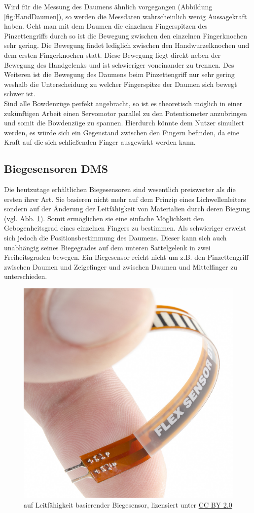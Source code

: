 \documentclass[a4paper,12pt,final]{article} %
\numberwithin{equation}{section} %
\numberwithin{figure}{section} %
\numberwithin{table}{section} %
\begin{document}
Wird für die Messung des Daumens ähnlich vorgegangen (Abbildung \ref{fig:HandDaumen}), so werden die Messdaten wahrscheinlich wenig Aussagekraft haben.
Geht man mit dem Daumen die einzelnen Fingerspitzen des Pinzettengriffs durch so ist die Bewegung zwischen den einzelnen Fingerknochen sehr gering. Die Bewegung findet lediglich zwischen den Hand\-wur\-zel\-knoch\-en und dem ersten Fingerknochen statt.
Diese Bewegung liegt direkt neben der Bewegung des Handgelenks und ist schwieriger voneinander zu trennen. Des Weiteren ist die Bewegung des Daumens beim Pinzettengriff nur sehr gering weshalb  die Unterscheidung zu welcher Fingerspitze der Daumen sich bewegt schwer ist.\\
Sind alle Bowdenzüge perfekt angebracht, so ist es theoretisch möglich in einer zukünftigen Arbeit einen Servomotor parallel zu den Potentiometer anzubringen und somit die Bowdenzüge zu spannen.
Hierdurch könnte dem Nutzer simuliert werden, es würde sich ein Gegenstand zwischen den Fingern befinden, da eine Kraft auf die sich schließenden Finger ausgewirkt werden kann.  
\subsection{Biegesensoren DMS}
Die heutzutage erhältlichen Biegesensoren sind wesentlich preiswerter als die ersten ihrer Art. Sie basieren nicht mehr auf dem Prinzip eines Lichwellenleiters sondern auf der Änderung der Leitfähigkeit von Materialien durch deren Biegung (vgl. Abb. \ref{fig:FlexSensor}). Somit ermöglichen sie eine einfache Möglichkeit den Gebogenheitsgrad eines einzelnen Fingers zu bestimmen. Als schwieriger erweist sich jedoch die Positionsbestimmung des Daumens. Dieser kann sich auch unabhängig seines Biegegrades auf dem unteren Sattelgelenk in zwei Freiheitsgraden bewegen. Ein Biegesensor reicht nicht um z.B. den Pinzettengriff zwischen Daumen und Zeigefinger und zwischen Daumen und Mittelfinger zu unterschieden.


\begin{figure}[ht]
	\begin{center}
		\includegraphics[width=0.5\linewidth]{Bilder/Flex_sensor.jpg}
		\caption{auf Leitfähigkeit basierender Biegesensor, lizensiert unter \href{https://creativecommons.org/licenses/by/2.0/}{CC BY 2.0}}
		\label{fig:FlexSensor}
	\end{center}
\end{figure}
\end{document}
